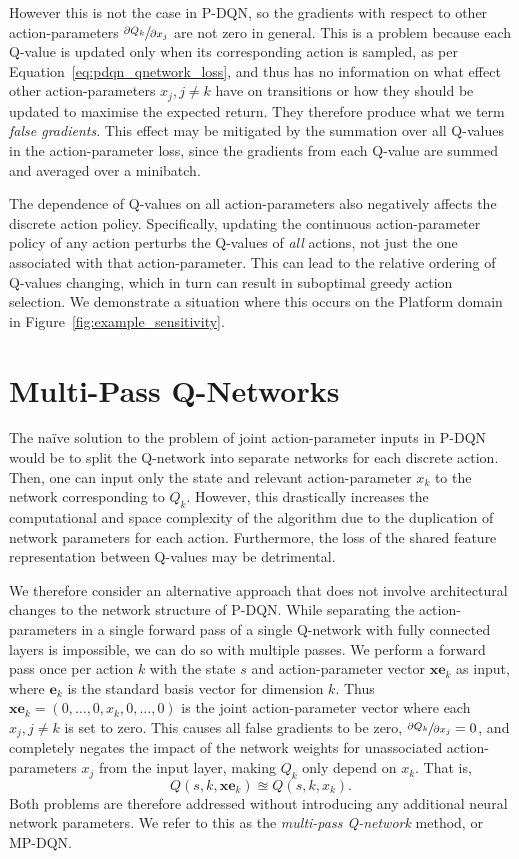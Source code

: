 \documentclass{article}
\def\PDQN*{P\nobreakdash-DQN}
\def\MPDQN*{MP\nobreakdash-DQN}
\begin{document}
However this is not the case in \PDQN*, so the gradients with respect to other action-parameters $\sfrac{\partial Q_k}{\partial x_j}$ are not zero in general. This is a problem because each Q-value is updated only when its corresponding action is sampled, as per Equation~\ref{eq:pdqn_qnetwork_loss}, and thus has no information on what effect other action-parameters $x_{j}, j \ne k$ have on transitions or how they should be updated to maximise the expected return. They therefore produce what we term \emph{false gradients}. This effect may be mitigated by the summation over all Q-values in the action-parameter loss, since the gradients from each Q-value are summed and averaged over a minibatch.

The dependence of Q-values on all action-parameters also negatively affects the discrete action policy. Specifically, updating the continuous action-parameter policy of any action perturbs the Q-values of \emph{all} actions,  not just the one associated with that action-parameter. This can lead to the relative ordering of Q-values changing, which in turn can result in suboptimal greedy action selection. We demonstrate a situation where this occurs on the Platform domain in Figure~\ref{fig:example_sensitivity}.


\section{Multi-Pass Q-Networks}

The na\"ive solution to the problem of joint action-parameter inputs in \PDQN* would be to split the Q-network into separate networks for each discrete action. Then, one can input only the state and relevant action-parameter $x_k$ to the network corresponding to $Q_k$. However, this drastically increases the computational and space complexity of the algorithm due to the duplication of network parameters for each action. Furthermore, the loss of the shared feature representation between Q-values may be detrimental.

We therefore consider an alternative approach that does not involve architectural changes to the network structure of \PDQN*. While separating the action-parameters in a single forward pass of a single Q-network with fully connected layers is impossible, we can do so with multiple passes. We perform a forward pass once per action $k$ with the state $s$ and action-parameter vector $\mathbf{xe}_k$ as input, where $\mathbf{e}_k$ is the standard basis vector for dimension $k$. Thus $\mathbf{xe}_k = \left(0,\ldots,0,x_k,0,\ldots,0\right)$ is the joint action-parameter vector where each $x_j, j\ne k$ is set to zero. This causes all false gradients to be zero, $\sfrac{\partial Q_k}{\partial x_j} = 0$, and completely negates the impact of the network weights for unassociated action-parameters $x_j$ from the input layer, making $Q_k$ only depend on $x_k$. That is, 
\begin{equation}
Q\left(s,k,\mathbf{xe}_k\right) \approxeq Q\left(s,k,x_k\right).
\end{equation} 
Both  problems are therefore addressed without introducing any additional neural network parameters. We refer to this as the \emph{multi-pass Q-network} method, or \MPDQN*.
\end{document}
